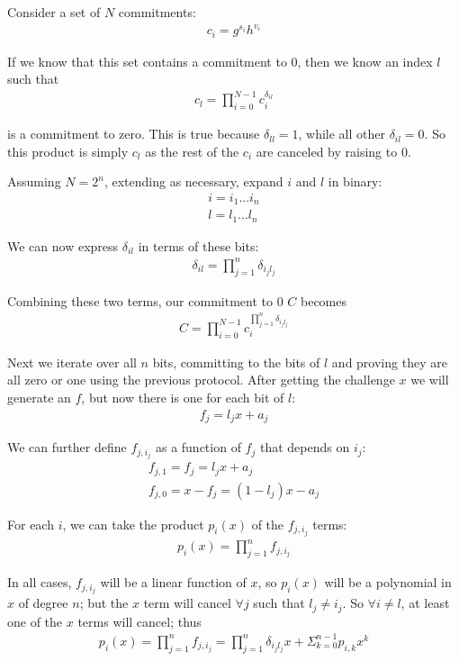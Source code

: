 \documentclass{article}
\begin{document}
Consider a set of $N$ commitments:
\begin{eqnarray}
  c_i = g^{s_i} h^{v_i}
\end{eqnarray}

If we know that this set contains a commitment to $0$, then we know an index $l$ such that
\begin{eqnarray}
  c_l = \prod_{i=0}^{N-1} c_i^{\delta_{il}}
\end{eqnarray}

is a commitment to zero.  This is true because $\delta_{ll} = 1$, while all other $\delta_{il} = 0$. So this product is simply $c_l$ as the rest of the $c_i$ are canceled by raising to $0$.

Assuming $N = 2^n$, extending as necessary, expand $i$ and $l$ in binary:
\begin{eqnarray}
  i = i_1...i_n\\
  l = l_1...l_n
\end{eqnarray}

We can now express $\delta_{il}$ in terms of these bits:
\begin{eqnarray}
  \delta_{il} = \prod_{j=1}^{n} \delta_{i_jl_j}
\end{eqnarray}
  
Combining these two terms, our commitment to $0$ $C$ becomes
\begin{eqnarray}
  C = \prod_{i=0}^{N-1}c_i^{\prod_{j=1}^{n} \delta_{i_jl_j}}
\end{eqnarray}

Next we iterate over all $n$ bits, committing to the bits of $l$ and proving they are all zero or one using the previous protocol.  After getting the challenge $x$ we will generate an $f$, but now there is one for each bit of $l$:
\begin{eqnarray}
  f_j = l_j x + a_j
\end{eqnarray}

We can further define $f_{j, i_j}$ as a function of $f_j$ that depends on $i_j$:
\begin{eqnarray}
  f_{j,1} = f_j = l_j x + a_j\\
  f_{j,0} = x - f_j = (1 - l_j) x - a_j
\end{eqnarray}

For each $i$, we can take the product $p_i(x)$ of the $f_{j, i_j}$ terms:
\begin{eqnarray}
  p_i(x) = \prod_{j=1}^{n} f_{j, i_j}
\end{eqnarray}

In all cases, $f_{j, i_j}$ will be a linear function of $x$, so $p_i(x)$ will be a polynomial in $x$ of degree $n$; but the $x$ term will cancel $\forall j$ such that $l_j \ne i_j$.  So $\forall i \ne l$, at least one of the $x$ terms will cancel; thus
\begin{eqnarray}
  p_i(x) = \prod_{j=1}^n f_{j,i_j} = {\prod_{j=1}^{n}\delta_{i_jl_j} x} + \Sigma_{k=0}^{n-1}{p_{i,k} x^k}
\end{eqnarray}
\end{document}
